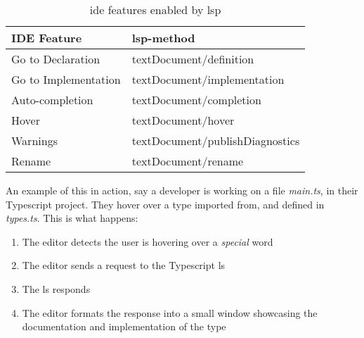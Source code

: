 \begin{table}[]
  \centering
  \caption{\gls*{ide} features enabled by \gls*{lsp}}
  \label{tbl:ide}
  \begin{tabular}{|l|l|}
    \hline
    IDE Feature & \gls*{lsp}-method \\ \hline
    Go to Declaration & textDocument/definition \\ \hline
    Go to Implementation & textDocument/implementation \\ \hline
    Auto-completion & textDocument/completion \\ \hline
    Hover & textDocument/hover \\ \hline
    Warnings & textDocument/publishDiagnostics \\ \hline
    Rename & textDocument/rename \\ \hline
  \end{tabular}
\end{table}

An example of this in action, say a developer is working on a file
\textit{main.ts}, in their Typescript project. They hover over a type imported
from, and defined in \textit{types.ts}. This is what happens:

\begin{enumerate}
  \item The editor detects the user is hovering over a \textit{special} word
  \item The editor sends a request to the Typescript \gls*{ls}
  \item The \gls*{ls} responds
  \item The editor formats the response into a small window showcasing the
    documentation and implementation of the type
\end{enumerate}
